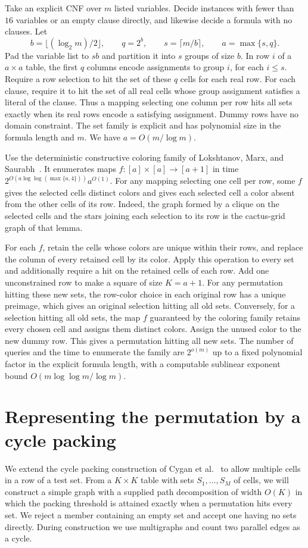 \documentclass[11pt]{article}
\begin{document}
Take an explicit CNF over \(m\) listed variables. Decide instances with fewer
than \(16\) variables or an empty clause directly, and likewise decide a
formula with no clauses. Let
\[
 b=\lfloor (\log_2 m)/2\rfloor,\qquad
 q=2^b,\qquad s=\lceil m/b\rceil,\qquad a=\max\{s,q\}.
\]
Pad the variable list to \(sb\) and partition it into \(s\) groups of size
\(b\). In row \(i\) of a \(a\times a\) table, the first \(q\) columns encode
assignments to group \(i\), for each \(i\le s\). Require a row selection to
hit the set of these \(q\) cells for each real row. For each clause, require
it to hit the set of all real cells whose group assignment satisfies a
literal of the clause. Thus a mapping selecting one column per row hits all
sets exactly when its real rows encode a satisfying assignment. Dummy
rows have no domain constraint. The set family is explicit and has polynomial
size in the formula length and \(m\). We have \(a=O(m/\log m)\).

Use the deterministic constructive coloring family of Lokshtanov, Marx, and
Saurabh~\cite[Lemma 2.8 and its proof]{lms}. It enumerates maps
\(f\colon[a]\times[a]\to[a+1]\) in time
\(2^{O(a\log\log(\max\{a,4\}))}a^{O(1)}\). For any mapping selecting one cell
per row, some \(f\) gives the selected cells distinct colors and gives each
selected cell a color absent from the other cells of its row. Indeed, the
graph formed by a clique on the selected cells and the stars joining each
selection to its row is the cactus-grid graph of that lemma.

For each \(f\), retain the cells whose colors are unique within their rows, and
replace the column of every retained cell by its color. Apply this operation to
every set and additionally require a hit on the retained cells of each row.
Add one unconstrained row to make a square of size \(K=a+1\).
For any permutation hitting these new sets, the row-color choice in each
original row has a unique preimage, which gives an original selection hitting
all old sets. Conversely, for a selection hitting all old sets, the map
\(f\) guaranteed by the coloring family retains every chosen cell and assigns
them distinct colors. Assign the unused color to the new dummy row. This
gives a permutation hitting all new sets. The number of queries and the time
to enumerate the family are \(2^{o(m)}\) up to a fixed polynomial factor in
the explicit formula length, with a computable sublinear exponent bound
\(O(m\log\log m/\log m)\).




\section{Representing the permutation by a cycle packing}
We extend the cycle packing construction of Cygan et al.~\cite{cc,ccpre}
to allow multiple cells in a row of a test set. From a
$K\times K$ table with sets $S_1,\ldots,S_M$ of cells, we will construct
a simple graph with a supplied path decomposition of width $O(K)$
in which the packing threshold is attained exactly when a permutation
hits every set. We reject a member containing an empty set and accept
one having no sets directly. During construction we use multigraphs
and count two parallel edges as a cycle.
\end{document}
